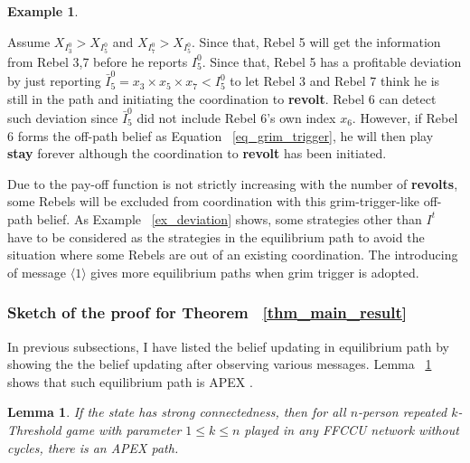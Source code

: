 \documentclass[12pt,letterpaper]{article}
\newtheorem*{main result}{Main Result}
\newtheorem{lemma}{Lemma}[section]
\theoremstyle{definition}
\newtheorem{example}{Example}[section]
\theoremstyle{remark}
\theoremstyle{claim}
\begin{document}
\begin{example}
\begin{center}
\end{center}

Assume $X_{I^0_3}>X_{I^0_5}$ and $X_{I^0_7}>X_{I^0_5}$. Since that, Rebel 5 will get the information from Rebel 3,7 before he reports $I^0_5$. Since that, Rebel 5 has a profitable deviation by just reporting $\bar{I}^0_5=x_3\times x_5\times x_7<I^0_5$ to let Rebel 3 and Rebel 7 think he is still in the path and initiating the coordination to \textbf{revolt}. Rebel 6 can detect such deviation since $\bar{I}^0_5$ did not include Rebel 6's own index $x_6$. However, if Rebel 6 forms the off-path belief as Equation ~\ref{eq_grim_trigger}, he will then play \textbf{stay} forever although the coordination to \textbf{revolt} has been initiated.

\end{example}

Due to the pay-off function is not strictly increasing with the number of \textbf{revolts}, some Rebels will be excluded from coordination with this grim-trigger-like off-path belief. As Example ~\ref{ex_deviation} shows, some strategies other than $I^t$ have to be considered as the strategies in the equilibrium path to avoid the situation where some Rebels are out of an existing coordination. The introducing of message $\langle 1 \rangle$ gives more equilibrium paths when grim trigger is adopted. 

\subsubsection{Sketch of the proof for Theorem ~\ref{thm_main_result}}

In previous subsections, I have listed the belief updating in equilibrium path by showing the the belief updating after observing various messages. Lemma ~\ref{lemma_in_the_path} shows that such equilibrium path is APEX . 
\begin{lemma}\label{lemma_in_the_path}
If the state has strong connectedness, then for all $n$-person repeated $k$-Threshold game with parameter $1\leq k\leq n$ played in any FFCCU network without cycles, there is an APEX path.
\end{lemma}
\end{document}
